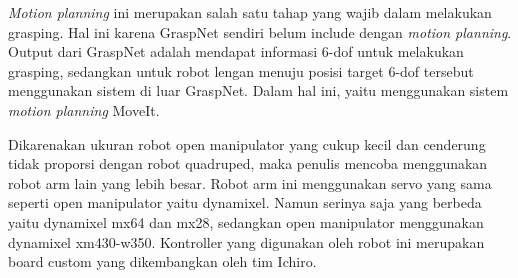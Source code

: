 \emph{Motion planning} ini merupakan salah satu tahap yang wajib dalam melakukan grasping.
Hal ini karena GraspNet sendiri belum include dengan \emph{motion planning}. Output dari GraspNet
adalah mendapat informasi 6-dof untuk melakukan grasping, sedangkan untuk robot lengan menuju posisi
target 6-dof tersebut menggunakan sistem di luar GraspNet. Dalam hal ini, yaitu menggunakan sistem \emph{motion
planning} MoveIt.

Dikarenakan ukuran robot open manipulator yang cukup kecil dan cenderung tidak proporsi dengan robot quadruped,
maka penulis mencoba menggunakan robot arm lain yang lebih besar. Robot arm ini menggunakan servo yang sama
seperti open manipulator yaitu dynamixel. Namun serinya saja yang berbeda yaitu dynamixel mx64 dan mx28, sedangkan
open manipulator menggunakan dynamixel xm430-w350. Kontroller yang digunakan oleh robot ini merupakan board custom
yang dikembangkan oleh tim Ichiro.

